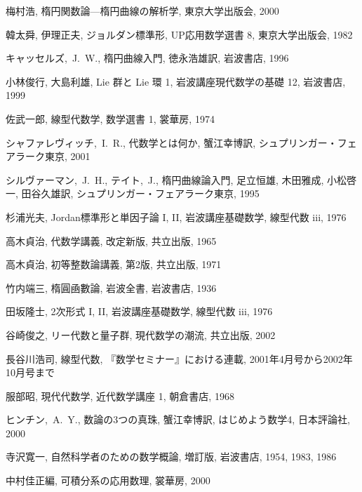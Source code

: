 \documentclass[12pt,twoside]{jarticle}
\begin{document}

\begin{thebibliography}{ABCD}

梅村浩, 楕円関数論---楕円曲線の解析学, 東京大学出版会, 2000

韓太舜, 伊理正夫, ジョルダン標準形, UP応用数学選書 8, 東京大学出版会, 1982

キャッセルズ,~J.~W., 楕円曲線入門, 徳永浩雄訳, 岩波書店, 1996

小林俊行, 大島利雄, Lie 群と Lie 環 1, 岩波講座現代数学の基礎 12,
岩波書店, 1999

佐武一郎, 線型代数学, 数学選書 1, 裳華房, 1974

シャファレヴィッチ,~I.~R., 代数学とは何か, 蟹江幸博訳, シュプリンガー・フェ
アラーク東京, 2001

シルヴァーマン,~J.~H., テイト,~J., 楕円曲線論入門, 
足立恒雄, 木田雅成, 小松啓一, 田谷久雄訳, 
シュプリンガー・フェアラーク東京, 1995

杉浦光夫, Jordan標準形と単因子論 I, II, 岩波講座基礎数学, 線型代数 iii, 1976

高木貞治, 代数学講義, 改定新版, 共立出版, 1965

高木貞治, 初等整数論講義, 第2版, 共立出版, 1971

竹内端三, 楕圓凾數論, 岩波全書, 岩波書店, 1936

田坂隆士, 2次形式 I, II, 岩波講座基礎数学, 線型代数 iii, 1976

谷崎俊之, リー代数と量子群, 現代数学の潮流, 共立出版, 2002

長谷川浩司, 線型代数, 『数学セミナー』における連載, 
2001年4月号から2002年10月号まで

服部昭, 現代代数学, 近代数学講座 1, 朝倉書店, 1968

ヒンチン,~A.~Y., 数論の3つの真珠, 蟹江幸博訳, はじめよう数学4, 日本評論社, 
2000

寺沢寛一, 自然科学者のための数学概論, 増訂版, 岩波書店, 1954, 1983, 1986

中村佳正編, 可積分系の応用数理, 裳華房, 2000


\end{thebibliography}
\end{document}
